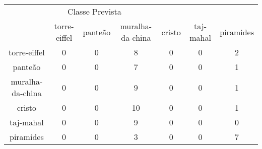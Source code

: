 \begin{tabular}{|c|c|c|c|c|c|c|}
\hline
\multicolumn{5}{|c|}{Classe Prevista}\\
 & torre-eiffel & panteão & muralha-da-china & cristo & taj-mahal & piramides\\
torre-eiffel & 0 & 0 & 8 & 0 & 0 & 2\\
panteão & 0 & 0 & 7 & 0 & 0 & 1\\
muralha-da-china & 0 & 0 & 9 & 0 & 0 & 1\\
cristo & 0 & 0 & 10 & 0 & 0 & 1\\
taj-mahal & 0 & 0 & 9 & 0 & 0 & 0\\
piramides & 0 & 0 & 3 & 0 & 0 & 7\\
\end{tabular}
